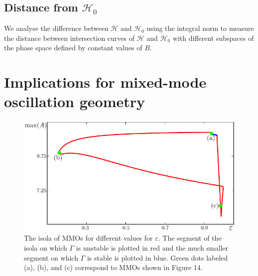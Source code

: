 \documentclass{ws-ijbc}
\begin{document}
\subsection{Distance from $\mathscr{H}_0$}

We analyse the difference between $\mathscr{H}$ and $\mathscr{H}_0$ using the integral norm to measure the distance between intersection curves of $\mathscr{H}$ and $\mathscr{H}_0$ with different subspaces of the phase space defined by constant values of $B$.


\section{Implications for mixed-mode oscillation geometry}


\begin{figure}[H]
\centering
\includegraphics[]{./figures/MKMO_12.pdf}
\caption{The isola of MMOs for different values for $\varepsilon$.  The segment of the isola on which $\Gamma$ is unstable is plotted in red and the much smaller segment on which $\Gamma$ is stable is plotted in blue.  Green dots labeled (a), (b), and (c) correspond to MMOs shown in Figure 14.}
\label{heteroclinic}
\end{figure}
\end{document}
